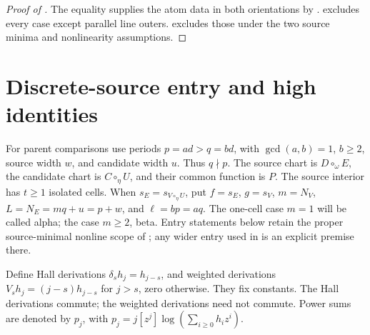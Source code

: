 \documentclass[11pt,a4paper]{amsart}
\numberwithin{equation}{section}
\theoremstyle{plain}
\theoremstyle{definition}
\begin{document}
\begin{proof}[Proof of ]
The equality supplies the atom data in both orientations by .   excludes every case except parallel line outers.   excludes those under the two source minima and nonlinearity assumptions.
\end{proof}

\section{Discrete-source entry and high identities}\label{sec:recovered-entry}
For parent comparisons use periods \(p=ad>q=bd\), with \(\gcd(a,b)=1\), \(b\ge2\), source width \(w\), and candidate width \(u\).  Thus \(q\nmid p\).  The source chart is \(D\circ_\omega E\), the candidate chart is \(C\circ_\eta U\), and their common function is \(P\).  The source interior has \(t\ge1\) isolated cells.  When \(s_E=s_{V\circ_\eta U}\), put \(f=s_E\), \(g=s_V\), \(m=N_V\), \(L=N_E=mq+u=p+w\), and \(\ell=bp=aq\).  The one-cell case \(m=1\) will be called alpha; the case \(m\ge2\), beta.  Entry statements below retain the proper source-minimal nonline scope of ; any wider entry used in  is an explicit premise there.

Define Hall derivations \(\delta_s h_j=h_{j-s}\), and weighted derivations \(V_sh_j=(j-s)h_{j-s}\) for \(j>s\), zero otherwise.  They fix constants.  The Hall derivations commute; the weighted derivations need not commute.  Power sums are denoted by \(p_j\), with \(p_j=j[z^j]\log(\sum_{i\ge0}h_i z^i)\).
\end{document}
